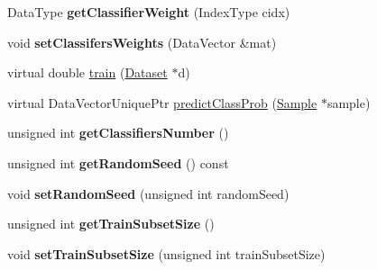\begin{DoxyCompactItemize}
\item 
\hypertarget{classffactory_1_1_p_e_r_t_a60e035f895310548467746d59ecc751e}{Data\-Type {\bfseries get\-Classifier\-Weight} (Index\-Type cidx)}\label{classffactory_1_1_p_e_r_t_a60e035f895310548467746d59ecc751e}

\item 
\hypertarget{classffactory_1_1_p_e_r_t_aa99c28e8d09f4583eb4dd92c804725c1}{void {\bfseries set\-Classifers\-Weights} (Data\-Vector \&mat)}\label{classffactory_1_1_p_e_r_t_aa99c28e8d09f4583eb4dd92c804725c1}

\item 
virtual double \hyperlink{classffactory_1_1_p_e_r_t_a7e8906ac8c355ab9832578d8acd41db0}{train} (\hyperlink{classffactory_1_1_dataset}{Dataset} $\ast$d)
\item 
virtual Data\-Vector\-Unique\-Ptr \hyperlink{classffactory_1_1_p_e_r_t_a5a5c35207769f3027dce04b69843bcc9}{predict\-Class\-Prob} (\hyperlink{classffactory_1_1_sample}{Sample} $\ast$sample)
\item 
\hypertarget{classffactory_1_1_p_e_r_t_a4105aa61ff4a216a3f4bb3c164ae873a}{unsigned int {\bfseries get\-Classifiers\-Number} ()}\label{classffactory_1_1_p_e_r_t_a4105aa61ff4a216a3f4bb3c164ae873a}

\item 
\hypertarget{classffactory_1_1_p_e_r_t_a8c00288c0b43d44a8c0945b7767c118a}{unsigned int {\bfseries get\-Random\-Seed} () const }\label{classffactory_1_1_p_e_r_t_a8c00288c0b43d44a8c0945b7767c118a}

\item 
\hypertarget{classffactory_1_1_p_e_r_t_af201f49e3a6c3c7e0cdc834849b9375d}{void {\bfseries set\-Random\-Seed} (unsigned int random\-Seed)}\label{classffactory_1_1_p_e_r_t_af201f49e3a6c3c7e0cdc834849b9375d}

\item 
\hypertarget{classffactory_1_1_p_e_r_t_a8105465a70933f22e2f690210b68e590}{unsigned int {\bfseries get\-Train\-Subset\-Size} ()}\label{classffactory_1_1_p_e_r_t_a8105465a70933f22e2f690210b68e590}

\item 
\hypertarget{classffactory_1_1_p_e_r_t_a9ab5d65e2ef12450d51da4c006cb2e89}{void {\bfseries set\-Train\-Subset\-Size} (unsigned int train\-Subset\-Size)}\label{classffactory_1_1_p_e_r_t_a9ab5d65e2ef12450d51da4c006cb2e89}

\end{DoxyCompactItemize}
